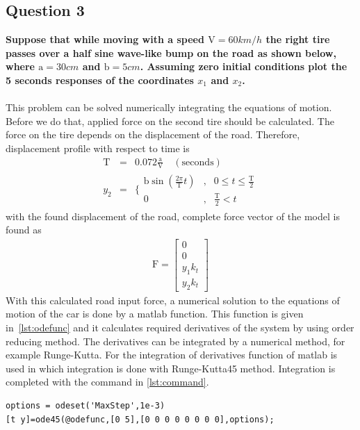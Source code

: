 \documentclass[]{report}
\begin{document}
\subsection*{Question 3}
\textbf{Suppose that while moving with a speed $\mathrm{V} = 60 km/h$ the right tire passes over a half sine wave-like bump on the road as shown below, where $\mathrm{a} = 30cm$ and $\mathrm{b} = 5cm$. Assuming zero initial conditions plot the 5 seconds responses of the coordinates $x_1$ and $x_2$.}
\\~\\
This problem can be solved numerically integrating the equations of motion. Before we do that, applied force on the second tire should be calculated. The force on the tire depends on the displacement of the road. Therefore, displacement profile with respect to time is
\begin{eqnarray*}
\mathrm{T}&= &0.072\frac{\mathrm{a}}{\mathrm{V}}\quad \mathrm{(seconds)}
\\
y_2&=&\{\begin{array}{clc}
\mathrm{b}\sin\left(\frac{2\pi}{\mathrm{T}}t\right) &,& 0\leq t \leq \frac{\mathrm{T}}{2} \\ 
0 &,& \frac{\mathrm{T}}{2}<t
\end{array}
\end{eqnarray*}
with the found displacement of the road, complete force vector of the model is found as
\begin{eqnarray*}
\mathrm{F}=\left[\begin{array}{ccc}
0\\
0\\
y_1 k_t\\
y_2 k_t
\end{array}\right]
\end{eqnarray*}
With this calculated road input force, a numerical solution to the equations of motion of the car is done by a matlab function. This function is given in~\cref{lst:odefunc} and it calculates required derivatives of the system by using order reducing method. The derivatives can be integrated by a numerical method, for example Runge-Kutta. For the integration of derivatives  function of matlab is used in which integration is done with Runge-Kutta45 method. Integration is completed with the command in \cref{lst:command}.
\lstset{frame=single,numbers=left}
\begin{lstlisting}[label=lst:command,caption=integration commands]
options = odeset('MaxStep',1e-3)
[t y]=ode45(@odefunc,[0 5],[0 0 0 0 0 0 0 0],options);
\end{lstlisting}
\end{document}
